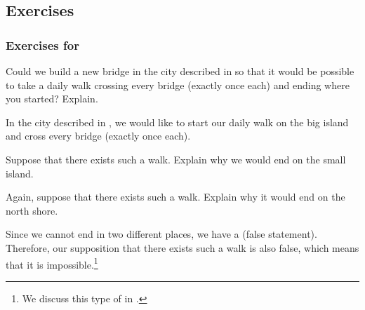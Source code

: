 
\subsection{Exercises}


\subsubsection*{Exercises for  \subbridges}

\begin{exer}[\exerP] %
\label{exer_add_bridge} 
    Could we build a new bridge in the city described in  so that it would be possible to take a daily walk crossing every bridge (exactly once each) and ending where you started?  Explain.
\end{exer}

\begin{exer}[\exerU]  
\label{exer_big_island}
   In the city described in , we would like to start our daily walk on the big island and cross every bridge (exactly once each). 
       \begin{exerpart}
           \item Suppose that there exists such a walk.  Explain why we would end on the small island.
           \item Again, suppose that there exists such a walk.  Explain why it would end on the north shore.
       \end{exerpart}
    Since we cannot end in two different places, we have a  (false statement).  Therefore, our supposition that there exists such a walk is also false, which means that it is impossible.\footnote{We discuss this type of  in .}
\end{exer}


